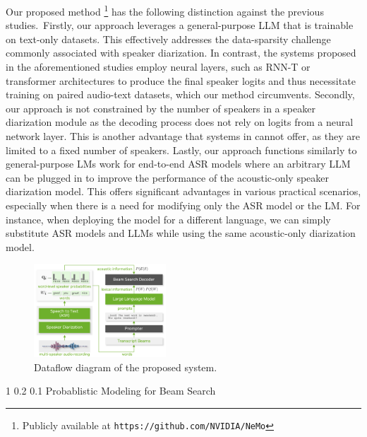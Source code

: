 \documentclass{article}
\makeatletter
\renewcommand{\section}{\@startsection
  {section}%
  {1}%
  {}%
  {0.2\baselineskip}%
  {0.1\baselineskip}%
  {}
}%
\makeatother
\begin{document}
Our proposed method \footnote{Publicly available at \texttt{https://github.com/NVIDIA/NeMo}} has the following distinction against the previous studies.~Firstly, our approach leverages a general-purpose LLM that is trainable on text-only datasets. This effectively addresses the data-sparsity challenge commonly associated with speaker diarization. In contrast, the systems proposed in the aforementioned studies \cite{shafey2019joint, xia2022turn, khare2022asr, park2020speaker, cheng2023exploring, jung2023encoder, paturi2023lexical} employ neural layers, such as RNN-T or transformer architectures to produce the final speaker logits and thus necessitate training on paired audio-text datasets, which our method circumvents. Secondly, our approach is not constrained by the number of speakers in a speaker diarization module as the decoding process does not rely on logits from a neural network layer. This is another advantage that systems in \cite{shafey2019joint, khare2022asr} cannot offer, as they are limited to a fixed number of speakers. Lastly, our approach functions similarly to general-purpose LMs work for end-to-end ASR models where an arbitrary LLM can be plugged in to improve the performance of the acoustic-only speaker diarization model. This offers significant advantages in various practical scenarios, especially when there is a need for modifying only the ASR model or the LM. For instance, when deploying the model for a different language, we can simply substitute ASR models and LLMs while using the same acoustic-only diarization model. 

\begin{figure}[t]
\centering
\includegraphics[width=0.44\textwidth]{pics/llm_ast_diar.png}
\caption{Dataflow diagram of the proposed system.}
\vspace{-6px}
\label{fig:llm_ast_diar}
\end{figure}

\section{Probablistic Modeling for Beam Search}
\label{sec:format}
\end{document}
